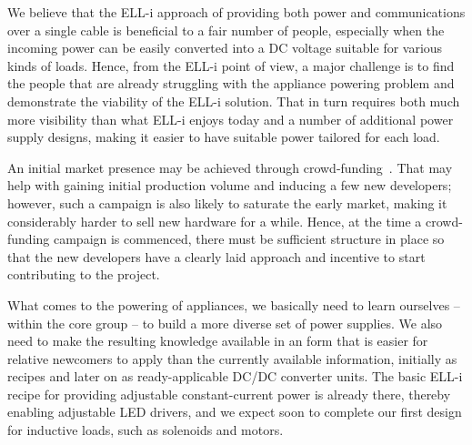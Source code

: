 \documentclass{siamltex}
\begin{document}
We believe that the ELL-i approach of providing both power and
communications over a single cable is beneficial to a fair number of
people, especially when the incoming power can be easily converted
into a DC voltage suitable for various kinds of loads.  Hence, from
the ELL-i point of view, a major challenge is to find the people that
are already struggling with the appliance powering problem and
demonstrate the viability of the ELL-i solution.  That in turn
requires both much more visibility than what ELL-i enjoys today and a
number of additional power supply designs, making it easier to have
suitable power tailored for each load.

An initial market presence may be achieved through
crowd-funding~\cite{kuppuswamy2013crowdfunding}.  That may help
with gaining initial production volume and inducing a few new
developers; however, such a campaign is also likely to saturate the
early market, making it considerably harder to sell new hardware for a
while.  Hence, at the time a crowd-funding campaign is commenced,
there must be sufficient structure in place so that the new developers
have a clearly laid approach and incentive to start contributing to
the project.

What comes to the powering of appliances, we basically need to learn
ourselves -- within the core group -- to build a more diverse set of
power supplies.  We also need to make the resulting knowledge
available in an form that is easier for relative newcomers to apply
than the currently available information, initially as recipes and
later on as ready-applicable DC/DC converter units.  The basic ELL-i
recipe for providing adjustable constant-current power is already
there, thereby enabling adjustable LED drivers, and we expect soon to
complete our first design for inductive loads, such as solenoids and
motors.
\end{document}
